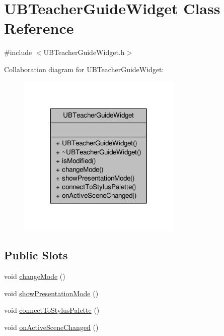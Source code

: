 \hypertarget{class_u_b_teacher_guide_widget}{\section{U\-B\-Teacher\-Guide\-Widget Class Reference}
\label{dc/d87/class_u_b_teacher_guide_widget}
}


{\ttfamily \#include $<$U\-B\-Teacher\-Guide\-Widget.\-h$>$}



Collaboration diagram for U\-B\-Teacher\-Guide\-Widget\-:
\nopagebreak
\begin{figure}[H]
\begin{center}
\leavevmode
\includegraphics[width=222pt]{d8/d8b/class_u_b_teacher_guide_widget__coll__graph}
\end{center}
\end{figure}
\subsection*{Public Slots}
\begin{DoxyCompactItemize}
\item 
void \hyperlink{class_u_b_teacher_guide_widget_abcfd08302d66000026473fbfa56890f6}{change\-Mode} ()
\item 
void \hyperlink{class_u_b_teacher_guide_widget_a9c51db0c57e1d629eb4db06e4e824d40}{show\-Presentation\-Mode} ()
\item 
void \hyperlink{class_u_b_teacher_guide_widget_a1c0c3d64852f3e7834f24b5d39a11d06}{connect\-To\-Stylus\-Palette} ()
\item 
void \hyperlink{class_u_b_teacher_guide_widget_a8f82786dfbc3eee454a3ed9008a1acb7}{on\-Active\-Scene\-Changed} ()
\end{DoxyCompactItemize}
